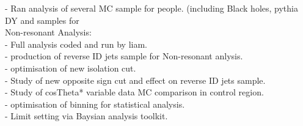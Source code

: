 - Ran analysis of several MC sample for people. (including Black holes, pythia DY and samples for \\


Non-resonant Analysis:\\

- Full analysis coded and run by liam.\\

- production of reverse ID jets sample for Non-resonant anlysis.\\

- optimisation of new isolation cut.\\

- Study of new opposite sign cut and effect on reverse ID jets sample.\\

- Study of cosTheta* variable data MC comparison in control region.\\

- optimisation of binning for statistical analysis.\\

- Limit setting via Baysian analysis toolkit.\\


